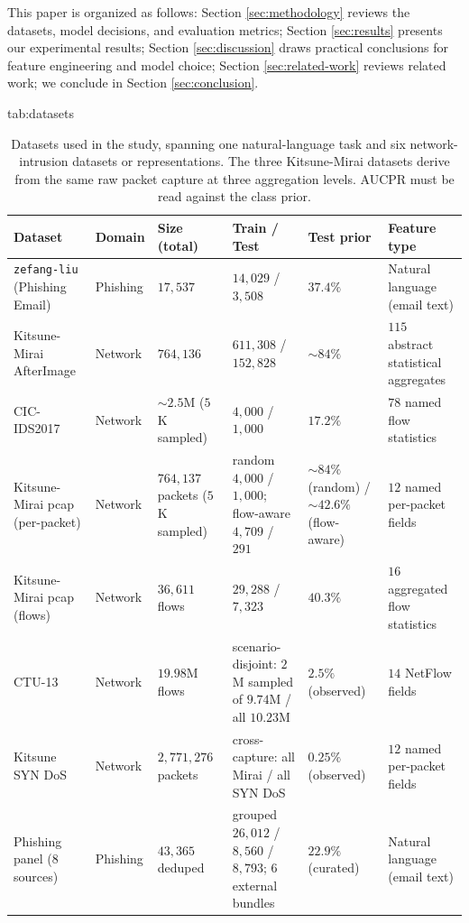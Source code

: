 \documentclass{jmlr}
\begin{document}
This paper is organized as follows: Section \ref{sec:methodology} reviews the datasets, model decisions, and evaluation metrics; Section \ref{sec:results} presents our experimental results; Section \ref{sec:discussion} draws practical conclusions for feature engineering and model choice; Section \ref{sec:related-work} reviews related work; we conclude in Section \ref{sec:conclusion}.
\begin{table}[t]
\floatconts
  {tab:datasets}%
  {\caption{Datasets used in the study, spanning one natural-language task and six
    network-intrusion datasets or representations. The three Kitsune-Mirai datasets derive from the same
    raw packet capture at three aggregation levels. AUCPR must be read against the class prior.}}
  {\footnotesize
  \begin{tabular}{@{}p{2.3cm}lp{2.0cm}p{2.6cm}p{1.9cm}p{2.8cm}@{}}
    \toprule
    \textbf{Dataset} & \textbf{Domain} & \textbf{Size (total)} & \textbf{Train / Test}
      & \textbf{Test prior} & \textbf{Feature type} \\
    \midrule
    \texttt{zefang-liu} (Phishing Email) & Phishing & $17{,}537$ & $14{,}029$ / $3{,}508$ & $37.4\%$
      & Natural language (email text) \\
    \addlinespace
    Kitsune-Mirai AfterImage & Network & $764{,}136$ & $611{,}308$ / $152{,}828$ & ${\sim}84\%$
      & $115$ abstract statistical aggregates \\
    \addlinespace
    CIC-IDS2017 & Network & ${\sim}2.5$M ($5$K sampled) & $4{,}000$ / $1{,}000$ & $17.2\%$
      & $78$ named flow statistics \\
    \addlinespace
    Kitsune-Mirai pcap (per-packet) & Network & $764{,}137$ packets ($5$K sampled)
      & random $4{,}000$ / $1{,}000$; flow-aware $4{,}709$ / $291$ & ${\sim}84\%$ (random) / ${\sim}42.6\%$ (flow-aware)
      & $12$ named per-packet fields \\
    \addlinespace
    Kitsune-Mirai pcap (flows) & Network & $36{,}611$ flows & $29{,}288$ / $7{,}323$ & $40.3\%$
      & $16$ aggregated flow statistics \\
    \addlinespace
    CTU-13 \citep{garcia2014empirical} & Network & $19.98$M flows & scenario-disjoint: $2$M sampled of $9.74$M / all $10.23$M & $2.5\%$ (observed)
      & $14$ NetFlow fields \\
    \addlinespace
    Kitsune SYN DoS & Network & $2{,}771{,}276$ packets & cross-capture: all Mirai / all SYN DoS & $0.25\%$ (observed)
      & $12$ named per-packet fields \\
    \addlinespace
    Phishing panel (8 sources) & Phishing & $43{,}365$ deduped & grouped $26{,}012$ / $8{,}560$ / $8{,}793$; $6$ external bundles & $22.9\%$ (curated)
      & Natural language (email text) \\
    \bottomrule
  \end{tabular}}
\end{table}
\end{document}
